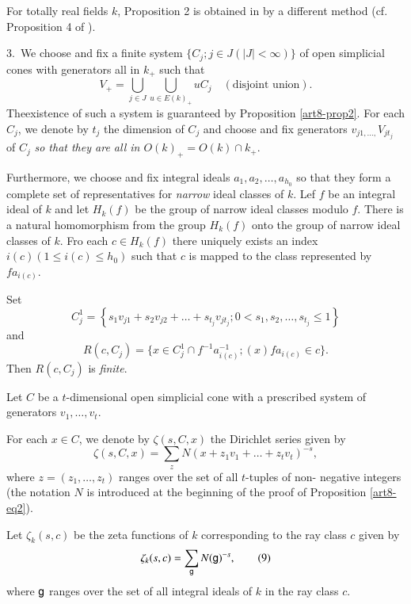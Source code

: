 \begin{remark*}
For totally real fields $k$, Proposition 2 is obtained in \cite{art8-1} by a different method (cf. Proposition 4 of \cite{art8-1}).
\end{remark*}

3.~We choose and fix a finite system $\{C_j ; j \in J (|J| < \infty)\}$ of open simplicial cones with generators all in $k_+$ such that 
\begin{equation}
V_+ = \bigcup\limits_{j \in J} \bigcup\limits_{u \in E (k)_+} u C_j \quad (\text{disjoint union}). \tag{7} \label{art8-eq7}
\end{equation}
The\pageoriginale existence of such a system is guaranteed by Proposition \ref{art8-prop2}. For each $C_j$, we denote by $t_j$ the dimension of $C_j$ and choose and fix generators $v_{j1, \ldots, } V_{jt_j}$ of $C_j$ \textit{so that they are all in $O(k)_+ = O(k) \cap k_+$}.

Furthermore, we choose and fix integral ideals $a_1, a_2, \ldots, a_{h_0}$ so that they form a complete set of representatives for \textit{narrow} ideal classes of $k$. Lef $f$ be an integral ideal of $k$ and let $H_k(f)$ be the group of narrow ideal classes modulo $f$. There is a natural homomorphism from the group $H_k(f)$ onto the group of narrow ideal classes of $k$. Fro each $c \in H_k(f)$ there uniquely exists an index $i(c) (1 \leqslant i (c) \leqslant h_0)$ such that $c$ is mapped to the class represented by $fa_{i(c)}$.

Set
$$
C^1_j = \left\{s_1 v_{j1} + s_2 v_{j2} + \ldots + s_{t_j} v_{jt_j} ; 0 < s_1, s_2 , \ldots, s_{t_j} \leqslant 1 \right\}
$$
and
$$
R(c, C_j) = \{x \in C^1_j \cap f^{-1} a^{-1}_{i(c)} ;(x) fa_{i(c)} \in c\}.
$$
Then $R(c,C_j)$ is \textit{finite}.

Let $C$ be a $t$-dimensional open simplicial cone with a prescribed system of generators $v_1, \ldots, v_t$.

For each $x \in C$, we denote by $\zeta (s, C,x)$ the Dirichlet series given by
\begin{equation}
\zeta (s, C, x) = \sum\limits_z N (x + z_1 v_1+ \ldots + z_t v_t )^{-s}, \label{art8-eq8}
\end{equation}
where $z = (z_1, \ldots, z_t)$ ranges over the set of all $t$-tuples of non- negative integers (the notation $N$ is introduced at the beginning of the proof of Proposition \ref{art8-eq2}).

Let $\zeta_k(s,c)$ be the zeta functions of $k$ corresponding to the ray class $c$ given by
\begin{equation}
\zeta_k (s,c) = \sum\limits_{\mathsf{g}} N (\mathsf{g})^{-s}, \tag{9}\label{art8-eq9}
\end{equation}
where $\mathsf{g}$ ranges over the set of all integral ideals of $k$ in the ray class $c$.

